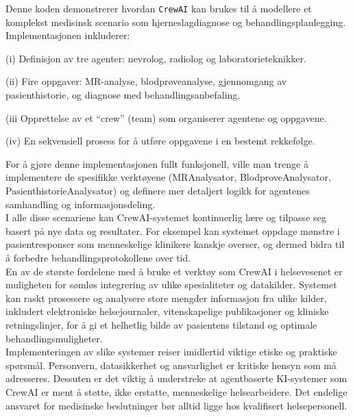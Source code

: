 \noindent Denne koden demonstrerer hvordan \texttt{CrewAI} kan brukes til å modellere et komplekst medisinsk scenario som hjerneslagdiagnose og behandlingsplanlegging. 
Implementasjonen inkluderer:
\begin{nobullets}
    \item (i) Definisjon av tre agenter: nevrolog, radiolog og laboratorieteknikker.
    \item (ii) Fire oppgaver: MR-analyse, blodprøveanalyse, gjennomgang av pasienthistorie, og diagnose med behandlingsanbefaling.
    \item (iii Opprettelse av et ``crew'' (team) som organiserer agentene og oppgavene.
    \item (iv) En sekvensiell prosess for å utføre oppgavene i en bestemt rekkefølge.
\end{nobullets}

For å gjøre denne implementasjonen fullt funksjonell, ville man trenge å implementere de spesifikke verktøyene (MRAnalysator, BlodproveAnalysator, PasienthistorieAnalysator) og definere mer detaljert logikk for agentenes samhandling og informasjonsdeling.\\






\noindent I alle disse scenariene kan CrewAI-systemet kontinuerlig lære og tilpasse seg basert på nye data og resultater. For eksempel kan systemet oppdage mønstre i pasientresponser som menneskelige klinikere kanskje overser, og dermed bidra til å forbedre behandlingsprotokollene over tid.\\

En av de største fordelene med å bruke et verktøy som CrewAI i helsevesenet er muligheten for sømløs integrering av ulike spesialiteter og datakilder. Systemet kan raskt prosessere og analysere store mengder informasjon fra ulike kilder, inkludert elektroniske helsejournaler, vitenskapelige publikasjoner og kliniske retningslinjer, for å gi et helhetlig bilde av pasientens tilstand og optimale behandlingsmuligheter.\\

Implementeringen av slike systemer reiser imidlertid viktige etiske og praktiske spørsmål. Personvern, datasikkerhet og ansvarlighet er kritiske hensyn som må adresseres. Dessuten er det viktig å understreke at agentbaserte KI-systemer som CrewAI er ment å støtte, ikke erstatte, menneskelige helsearbeidere. Det endelige ansvaret for medisinske beslutninger bør alltid ligge hos kvalifisert helsepersonell.\\


